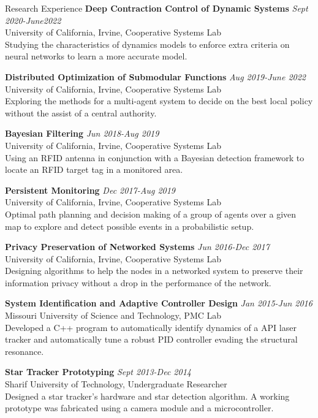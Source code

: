 \begin{rSection}{Research Experience}
{\bf Deep Contraction Control of Dynamic Systems} \hfill {\em Sept 2020-June2022}\\
University of California, Irvine, Cooperative Systems Lab\\
{\footnotesize Studying the characteristics of dynamics models to enforce extra criteria on neural networks to learn a more accurate model.}

{\bf Distributed Optimization of Submodular Functions} \hfill {\em Aug 2019-June 2022}\\
University of California, Irvine, Cooperative Systems Lab\\
{\footnotesize Exploring the methods for a multi-agent system to decide on the best local policy without the assist of a central authority.}

{\bf Bayesian Filtering} \hfill {\em Jun 2018-Aug 2019}\\
University of California, Irvine, Cooperative Systems Lab\\
{\footnotesize Using an RFID antenna in conjunction with a Bayesian detection framework to locate an RFID target tag in a monitored area.}

{\bf Persistent Monitoring} \hfill {\em Dec 2017-Aug 2019}\\
University of California, Irvine, Cooperative Systems Lab\\
{\footnotesize Optimal path planning and decision making of a group of agents over a given map to explore and detect possible events in a probabilistic setup.}

{\bf Privacy Preservation of Networked Systems} \hfill {\em Jun 2016-Dec 2017}\\
University of California, Irvine, Cooperative Systems Lab\\
{\footnotesize Designing algorithms to help the nodes in a networked system to preserve their information privacy without a drop in the performance of the network.}

{\bf System Identification and Adaptive Controller Design} \hfill {\em Jan 2015-Jun 2016}\\
Missouri University of Science and Technology, PMC Lab\\
{\footnotesize Developed a C++ program to automatically identify dynamics of a API laser tracker and automatically tune a robust PID controller evading the structural resonance.}

{\bf Star Tracker Prototyping} \hfill {\em Sept 2013-Dec 2014}\\
Sharif University of Technology, Undergraduate Researcher\\
{\footnotesize Designed a star tracker's hardware and star detection algorithm. A working prototype was fabricated using a camera module and a microcontroller.}

\end{rSection}